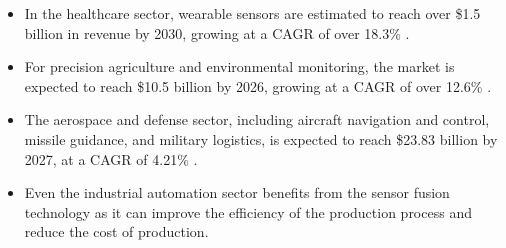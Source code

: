 \documentclass[rnd]{mas_proposal}
\begin{document}
\begin{itemize}
    \item In the healthcare sector, wearable sensors are estimated to reach over \$1.5 billion in revenue by 2030, growing at a CAGR of over 18.3\% \cite{straitsresearch2021}.
    
    \item For precision agriculture and environmental monitoring, the market is expected to reach \$10.5 billion by 2026, growing at a CAGR of over 12.6\% \cite{mordorintelligence2023}.
    
    \item The aerospace and defense sector, including aircraft navigation and control, missile guidance, and military logistics, is expected to reach \$23.83 billion by 2027, at a CAGR of 4.21\% \cite{fortunebusinessinsights2023}.
    
    \item Even the industrial automation sector benefits from the sensor fusion technology as it can improve the efficiency of the production process and reduce the cost of production.





    





\end{itemize}
\end{document}
